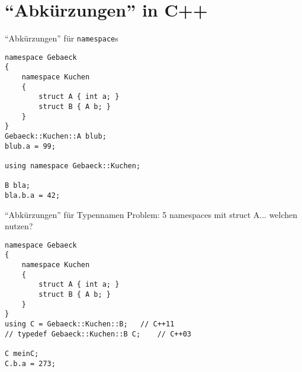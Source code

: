 \section{\enquote{Abkürzungen} in C++}

\begin{frame}[fragile]{\enquote{Abkürzungen} für \texttt{namespace}s}
	
	\begin{lstlisting}[]
namespace Gebaeck
{
    namespace Kuchen
    {
        struct A { int a; }
        struct B { A b; }
    }
}
Gebaeck::Kuchen::A blub;
blub.a = 99;

using namespace Gebaeck::Kuchen;

B bla;
bla.b.a = 42;
	\end{lstlisting}
\end{frame}

\begin{frame}[fragile]{\enquote{Abkürzungen} für Typennamen}
	Problem: 5 namespaces mit struct A... welchen nutzen?

	\begin{lstlisting}[]
namespace Gebaeck
{
    namespace Kuchen
    {
        struct A { int a; }
        struct B { A b; }
    }
}
using C = Gebaeck::Kuchen::B;	// C++11
// typedef Gebaeck::Kuchen::B C;	// C++03

C meinC;
C.b.a = 273;
	\end{lstlisting}
\end{frame}


